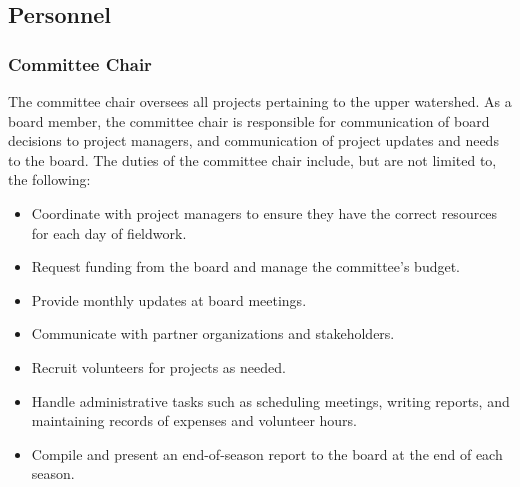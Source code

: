 \documentclass[letterpaper,11pt,leqno]{article}
\begin{document}
\subsection{Personnel}

\subsubsection{Committee Chair}

The committee chair oversees all projects pertaining to the upper watershed. As a board member, the committee chair is responsible for
communication of board decisions to project managers, and communication of project updates and needs to the board. The duties of the committee chair include, but are not limited to, the following:
\begin{itemize}
\item Coordinate with project managers to ensure they have the correct resources for each day of fieldwork.
\item Request funding from the board and manage the committee's budget.
\item Provide monthly updates at board meetings.
\item Communicate with partner organizations and stakeholders.
\item Recruit volunteers for projects as needed.
\item Handle administrative tasks such as scheduling meetings, writing reports, and maintaining records of expenses and volunteer hours.
\item Compile and present an end-of-season report to the board at the end of each season.
\end{itemize}
\end{document}
